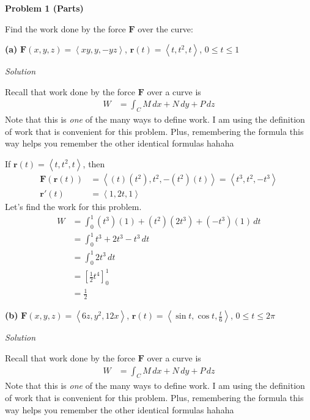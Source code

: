 \documentclass{article}
\newcommand{\lrp}[1]{\left( #1 \right)}
\newcommand{\lra}[1]{\left\langle #1 \right\rangle}
\newcommand{\lrb}[1]{\left[ #1 \right]}
\renewcommand{\r}[0]{\mathbf{r}}
\newcommand{\F}[0]{\mathbf{F}}
\newcommand{\Solution}{\textit{Solution}}
\begin{document}
{}\textbf{Problem 1 (Parts)}

Find the work done by the force $\F$ over the curve:

{}\textbf{(a)} $\F\lrp{x,y,z}=\lra{xy,y,-yz}$, $\r(t)=\lra{t,t^2,t}$, $0\leq t\leq 1$

\Solution

Recall that work done by the force $\F$ over a curve is
\begin{align*}
    W&=\int_C M\,dx + N\,dy + P\,dz
\end{align*}
Note that this is \textit{one} of the many ways to define work. I am using the definition of work that is convenient for this problem. Plus, remembering the formula this way helps you remember the other identical formulas hahaha

If $\r(t)=\lra{t,t^2,t}$, then
\begin{align*}
    \F\lrp{\r(t)}&=\lra{(t)(t^2),t^2,-(t^2)(t)}=\lra{t^3,t^2,-t^3}\\
    \r'(t)&=\lra{1,2t,1}
\end{align*}
Let's find the work for this problem.
\begin{align*}
    W&=\int_0^1 (t^3)(1)+(t^2)(2t^3)+(-t^3)(1)\,dt\\
    &=\int_0^1 t^3 +2t^3 - t^3\,dt\\
    &=\int_0^1 2t^3\,dt\\
    &=\lrb{\frac{1}{2}t^4}_0^1\\
    &=\boxed{\frac{1}{2}}
\end{align*}

{}\textbf{(b)} $\F\lrp{x,y,z}=\lra{6z,y^2,12x}$, $\displaystyle\r(t)=\lra{\sin t, \cos t, \frac{t}{6}}$, $0\leq t \leq 2\pi$

\Solution

Recall that work done by the force $\F$ over a curve is
\begin{align*}
    W&=\int_C M\,dx + N\,dy + P\,dz
\end{align*}
Note that this is \textit{one} of the many ways to define work. I am using the definition of work that is convenient for this problem. Plus, remembering the formula this way helps you remember the other identical formulas hahaha
\end{document}
